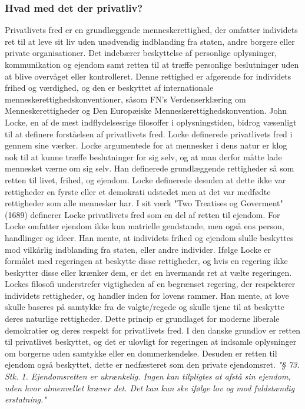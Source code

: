 \subsubsection{Hvad med det der privatliv?} %
Privatlivets fred er en grundlæggende menneskerettighed, der omfatter individets ret til at leve sit liv uden unødvendig indblanding fra staten, andre borgere eller private organisationer. Det indebærer beskyttelse af personlige oplysninger, kommunikation og ejendom samt retten til at træffe personlige beslutninger uden at blive overvåget eller kontrolleret. Denne rettighed er afgørende for individets frihed og værdighed, og den er beskyttet af internationale menneskerettighedskonventioner, såsom FN's Verdenserklæring om Menneskerettigheder og Den Europæiske Menneskerettighedskonvention. John Locke, en af de mest indflydelsesrige filosoffer i oplysningstiden, bidrog væsenligt til at definere forståelsen af privatlivets fred. Locke definerede privatlivets fred i gennem sine værker. Locke argumentede for at mennesker i dens natur er klog nok til at kunne træffe beslutninger for sig selv, og at man derfor måtte lade mennesket værne om sig selv. Han definerede grundlæggende rettigheder så som retten til livet, frihed, og ejendom. Locke definerede desuden at dette ikke var rettigheder en fyrste eller et demokrati udstedet men at det var medfødte rettigheder som alle mennesker har. I sit værk "Two Treatises og Goverment" (1689) definerer Locke privatlivets fred som en del af retten til ejendom. For Locke omfatter ejendom ikke kun matrielle gendstande, men også ens person, handlinger og ideer. Han mente, at individets frihed og ejendom slulle beskyttes mod vilkårlig indblanding fra staten, eller andre individer. Ifølge Locke er formålet med regeringen at beskytte disse rettigheder, og hvis en regering ikke beskytter disse eller krænker dem, er det en hvermands ret at vælte regeringen. Lockes filosofi understrefer vigtigheden af en begrænset regering, der respekterer individets rettigheder, og handler inden for lovens rammer. Han mente, at love skulle baseres på samtykke fra de valgte/regede og skulle tjene til at beskytte deres naturlige rettigheder. Dette princip er grundlaget for moderne liberale demokratier og deres respekt for privatlivets fred. I den danske grundlov er retten til privatlivet beskyttet, og det er ulovligt for regeringen at indsamle oplysninger om borgerne uden samtykke eller en dommerkendelse. Desuden er retten til ejendom også beskyttet, dette er nedfæsteret som den private ejendomsret. \emph{"§ 73. Stk. 1. Ejendomsretten er ukrænkelig. Ingen kan tilpligtes at afstå sin ejendom, uden hvor almenvellet kræver det. Det kan kun ske ifølge lov og mod fuldstændig erstatning."}
